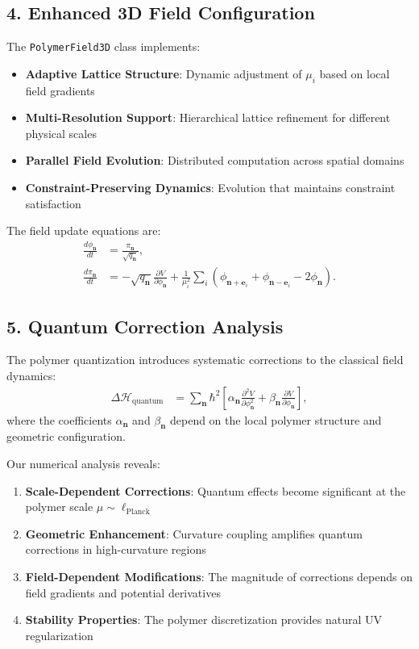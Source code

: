 \documentclass[12pt]{article}
\begin{document}
\subsection*{4. Enhanced 3D Field Configuration}
The \texttt{PolymerField3D} class implements:
\begin{itemize}
  \item \textbf{Adaptive Lattice Structure}: Dynamic adjustment of $\mu_i$ based on local field gradients
  \item \textbf{Multi-Resolution Support}: Hierarchical lattice refinement for different physical scales
  \item \textbf{Parallel Field Evolution}: Distributed computation across spatial domains
  \item \textbf{Constraint-Preserving Dynamics}: Evolution that maintains constraint satisfaction
\end{itemize}

The field update equations are:
\begin{align}
  \frac{d\phi_{\mathbf{n}}}{dt} &= \frac{\pi_{\mathbf{n}}}{\sqrt{q_{\mathbf{n}}}}, \\
  \frac{d\pi_{\mathbf{n}}}{dt} &= -\sqrt{q_{\mathbf{n}}} \frac{\partial V}{\partial \phi_{\mathbf{n}}} + \frac{1}{\mu_i^2}\sum_i (\phi_{\mathbf{n}+\mathbf{e}_i} + \phi_{\mathbf{n}-\mathbf{e}_i} - 2\phi_{\mathbf{n}}).
\end{align}

\subsection*{5. Quantum Correction Analysis}
The polymer quantization introduces systematic corrections to the classical field dynamics:
\begin{align}
  \Delta \mathcal{H}_{\text{quantum}} &= \sum_{\mathbf{n}} \hbar^2 \left[\alpha_{\mathbf{n}} \frac{\partial^2 V}{\partial \phi_{\mathbf{n}}^2} + \beta_{\mathbf{n}} \frac{\partial V}{\partial \phi_{\mathbf{n}}}\right],
\end{align}
where the coefficients $\alpha_{\mathbf{n}}$ and $\beta_{\mathbf{n}}$ depend on the local polymer structure and geometric configuration.

Our numerical analysis reveals:
\begin{enumerate}
  \item \textbf{Scale-Dependent Corrections}: Quantum effects become significant at the polymer scale $\mu \sim \ell_{\text{Planck}}$
  
  \item \textbf{Geometric Enhancement}: Curvature coupling amplifies quantum corrections in high-curvature regions
  
  \item \textbf{Field-Dependent Modifications}: The magnitude of corrections depends on field gradients and potential derivatives
  
  \item \textbf{Stability Properties}: The polymer discretization provides natural UV regularization
\end{enumerate}
\end{document}
